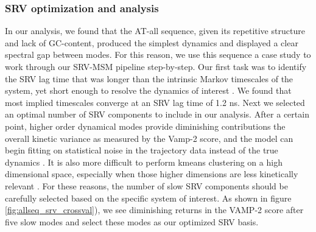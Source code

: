 \documentclass[journal=jpcbfk,manuscript=article]{achemso}
\begin{document}
\subsubsection{SRV optimization and analysis}
In our analysis, we found that the AT-all sequence, given its repetitive structure and lack of GC-content, produced the simplest dynamics and displayed a clear spectral gap between modes. For this reason, we use this sequence a case study to work through our SRV-MSM pipeline step-by-step. Our first task was to identify the SRV lag time that was longer than the intrinsic Markov timescales of the system, yet short enough to resolve the dynamics of interest \citep{Phys2018MarkovValidation}. We found that most implied timescales converge at an SRV lag time of 1.2 ns. Next we selected an optimal number of SRV components to include in our analysis. After a certain point, higher order dynamical modes provide diminishing contributions the overall kinetic variance as measured by the Vamp-2 score, and the model can begin fitting on statistical noise in the trajectory data instead of the true dynamics \citep{McGibbon2015VariationalKinetics}. It is also more difficult to perform kmeans clustering on a high dimensional space, especially when those higher dimensions are less kinetically relevant \citep{Pande2010EverythingAsk}. For these reasons, the number of slow SRV components should be carefully selected based on the specific system of interest. As shown in figure \ref{fig:allseq_srv_crossval}), we see diminishing returns in the VAMP-2 score after five slow modes and select these modes as our optimized SRV basis.
\end{document}
